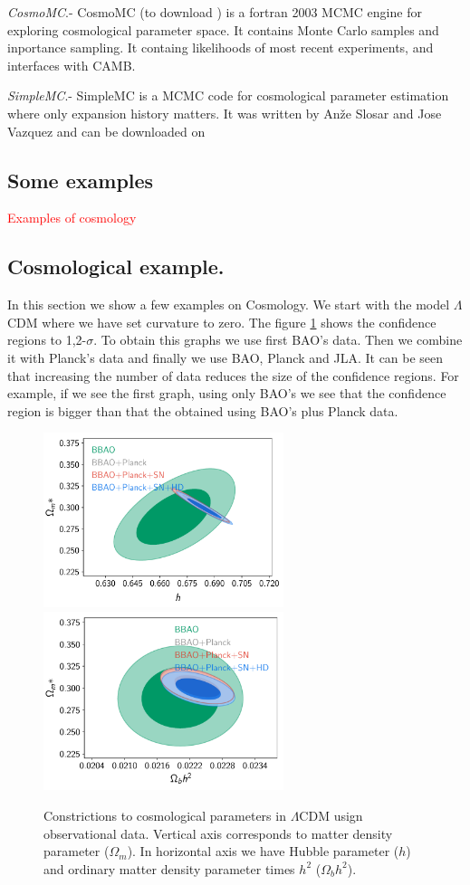 \documentclass[onecolumn,           %
               showpacs,            %
               preprintnumbers,     %
               aps,                 %
               letterpaper,             %
               superscriptaddress,      %
               nofootinbib,         %
               tightenlines,        %
               floats,floatfix      %
               ,usenatbib,
               ]{revtex4-1}
\begin{document}
\textit{CosmoMC}.- CosmoMC (to download \cite{cosmomc}) is a fortran 2003 MCMC engine for exploring cosmological parameter space. It contains Monte Carlo samples and inportance sampling. It containg likelihoods of most recent experiments, and interfaces with CAMB.

\textit{SimpleMC}.- SimpleMC is a MCMC code for cosmological parameter estimation where only expansion history matters. It was written by Anže Slosar and Jose Vazquez and can be downloaded on \cite{simplemc}

\subsection{Some examples}
\textcolor{red}{Examples of cosmology}
\subsection{Cosmological example.}
In this section we show a few examples on Cosmology. We start with the model $\Lambda$CDM where we have set curvature to zero. The figure \ref{LCDM} shows the confidence regions to 1,2-$\sigma$. To obtain this graphs we use first BAO's data. Then we combine it with Planck's data and finally we use BAO, Planck and JLA. It can be seen that increasing the number of data reduces the size of the confidence regions. For example, if we see the first graph, using only BAO's we see that the confidence region is bigger than that the obtained using BAO's plus Planck data. 

\begin{figure}[htp]
	\centering
	\includegraphics[width=7cm]{FiguresCosmo/h_Om_LCDM_todas.pdf}	
	\includegraphics[width=7cm]{FiguresCosmo/Obh2_Om_LCDM_todas.pdf}
	\caption{Constrictions to cosmological parameters in $\Lambda$CDM usign observational data. Vertical axis corresponds to matter density parameter ($\Omega_m$). In horizontal axis we have Hubble parameter ($h$) and ordinary matter density parameter times $h^2$ ($\Omega_b h^2$).}
	\label{LCDM}
\end{figure}
\end{document}
